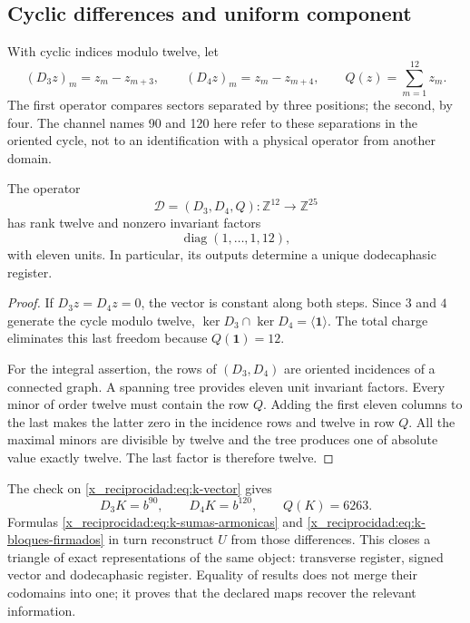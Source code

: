 \subsection{Cyclic differences and uniform component}
\label{x_reciprocidad:subsec:k-transversal}

With cyclic indices modulo twelve, let
\[
 (D_3z)_m=z_m-z_{m+3},\qquad(D_4z)_m=z_m-z_{m+4},
 \qquad Q(z)=\sum_{m=1}^{12}z_m.
\]
The first operator compares sectors separated by three positions; the
second, by four. The channel names 90 and 120 here refer to
these separations in the oriented cycle, not to an identification with a
physical operator from another domain.

\begin{proposition}
\label{x_reciprocidad:prop:k-transversal}
The operator
\[
 \mathcal D=(D_3,D_4,Q):\mathbb Z^{12}\longrightarrow\mathbb Z^{25}
\]
has rank twelve and nonzero invariant factors
\[
 \operatorname{diag}(1,\ldots,1,12),
\]
with eleven units. In particular, its outputs determine a unique dodecaphasic register.
\end{proposition}

\begin{proof}
If \(D_3z=D_4z=0\), the vector is constant along both steps.
Since \(3\) and \(4\) generate the cycle modulo twelve,
\(\ker D_3\cap\ker D_4=\langle\mathbf1\rangle\). The total charge
eliminates this last freedom because \(Q(\mathbf1)=12\).

For the integral assertion, the rows of \((D_3,D_4)\) are oriented incidences
of a connected graph. A spanning tree provides eleven
unit invariant factors. Every minor of order twelve must contain the
row \(Q\). Adding the first eleven columns to the last makes the latter
zero in the incidence rows and twelve in row \(Q\). All
the maximal minors are divisible by twelve and the tree produces one of
absolute value exactly twelve. The last factor is therefore twelve.
\end{proof}

The check on \eqref{x_reciprocidad:eq:k-vector} gives
\[
 D_3K=b^{90},\qquad D_4K=b^{120},\qquad Q(K)=6263.
\]
Formulas \eqref{x_reciprocidad:eq:k-sumas-armonicas} and
\eqref{x_reciprocidad:eq:k-bloques-firmados} in turn reconstruct \(U\) from those
differences. This closes a triangle of exact representations of the
same object: transverse register, signed vector and dodecaphasic register. Equality
of results does not merge their codomains into one; it proves that
the declared maps recover the relevant information.


